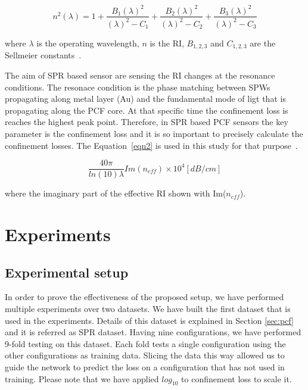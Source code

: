 \documentclass[10pt]{IEEEtran}
\begin{document}
\begin{equation}
n^2(\lambda)=1+\frac{ B_1 (\lambda)^2} {(\lambda)^2-C_1} + \frac{ B_2 (\lambda)^2} {(\lambda)^2-C_2} + \frac{ B_3 (\lambda)^2} {(\lambda)^2-C_3}
\label{eqn1}
\end{equation}

where $\lambda$ is the operating wavelength, $n$ is the RI, $B_{1,2,3}$ and  $C_{1,2,3}$ are the  Sellmeier constants~\cite{bjarklev2003PCF}.


The aim of SPR based sensor are sensing the RI changes at the resonance conditions. The resonace condition is the phase matching between SPWs propagating along metal layer (Au) and the fundamental mode of ligt that is propagating along the PCF core. At that specific time the confinement loss is reaches the highest peak point. Therefore, in SPR based PCF sensors the key parameter is the confinement loss and it is so important to precisely calculate the confinement losses. The Equation~\ref{eqn2} is used in this study for that purpose~\cite{yasli2019effect}.

\begin{equation}
\frac{40\pi}{ln(10) \lambda} Im(n_{eff}) \times 10^{4} [dB/cm]
\label{eqn2}
\end{equation}

where the imaginary part of the effective RI shown with Im($n_{eff}$).



\section{Experiments}
\label{sec:exp}

\subsection{Experimental setup}

\def\dszero{PCF}

In order to prove the effectiveness of the proposed setup, we have performed multiple experiments over two datasets. We have built the first dataset that is used in the experiments. Details of this dataset is explained in Section \ref{sec:pcf} and it is referred as SPR dataset. Having nine configurations, we have performed 9-fold testing on this dataset. Each fold tests a single configuration using the other configurations as training data. Slicing the data this way allowed us to guide the network to predict the loss on a configuration that has not used in training. Please note that we have applied $log_{10}$ to confinement loss to scale it.
\end{document}
